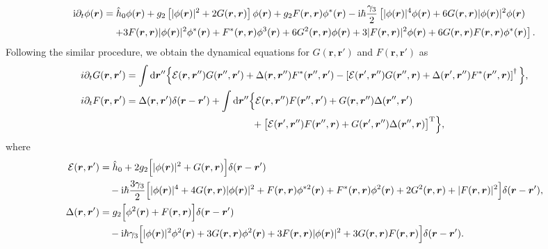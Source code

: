 \documentclass[pra,twocolumn,preprintnumbers,superscriptaddress,longbibliography,showkeys]{revtex4-1}
\begin{document}
\begin{widetext}
\begin{align}
{\rm i} \partial_{t} \phi({\bm r}) & = \hat h_{0} \phi({\bm r}) + g_{2} \left[ \vert \phi({\bm r}) \vert^{2} + 2G({\bm r}, {\bm r}) \right] \phi({\bm r}) + g_{2} F({\bm r}, {\bm r}) \phi^{\ast}({\bm r})-{\rm i} \hbar\frac{\gamma_{3}}{2} \left[ \vert \phi({\bm r}) \vert^{4} \phi({\bm r}) + 6 G({\bm r}, {\bm r}) \vert \phi({\bm r}) \vert^{2} \phi({\bm r})\right. \notag \\
&\quad\left.+ 3 F({\bm r}, {\bm r}) \vert \phi({\bm r}) \vert^{2} \phi^{\ast}({\bm r}) + F^{\ast}({\bm r}, {\bm r}) \phi^{3}({\bm r}) + 6 G^{2}({\bm r}, {\bm r}) \phi({\bm r})+ 3 \vert F({\bm r}, {\bm r}) \vert^{2} \phi({\bm r}) + 6 G({\bm r}, {\bm r}) F({\bm r}, {\bm r}) \phi^{\ast}({\bm r}) \right].\label{tevophi}
\end{align}
Following the similar procedure, we obtain the dynamical equations for $G({\bm r}, {\bm r}')$ and $F({\bm r}, {\bm r}')$ as
\begin{align}
i \partial_{t} G({\bm r}, {\bm r}') &= \int {\rm d}{\bm r}'' \Big\{ \mathcal{E}({\bm r}, {\bm r}'') G({\bm r}'', {\bm r}') + \Delta({\bm r}, {\bm r}'') F^{\ast}({\bm r}'', {\bm r}')- \left[ \mathcal{E}({\bm r}', {\bm r}'') G({\bm r}'', {\bm r}) + \Delta({\bm r}', {\bm r}'') F^{\ast}({\bm r}'', {\bm r}) \right]^{\dagger} \Big\},\label{tevog}\\
i \partial_{t} F({\bm r}, {\bm r}') &= \Delta({\bm r}, {\bm r}') \delta({\bm r} - {\bm r}') + \int {\rm d}{\bm r}'' \Big\{ \mathcal{E}({\bm r}, {\bm r}'') F({\bm r}'', {\bm r}')+ G({\bm r}, {\bm r}'') \Delta({\bm r}'', {\bm r}') \nonumber\\
&\qquad\qquad\qquad\qquad\qquad\qquad\quad+ \big[ \mathcal{E}({\bm r}', {\bm r}'') F({\bm r}'', {\bm r})+ G({\bm r}', {\bm r}'') \Delta({\bm r}'', {\bm r}) \big]^{\rm T} \Big\},\label{tevof}
\end{align}
where
\begin{align}
\mathcal{E}({\bm r}, {\bm r}^{\prime}) &= \hat h_{0} + 2 g_{2} \Big[ \vert \phi({\bm r}) \vert^{2} + G({\bm r}, {\bm r}) \Big]\delta({\bm r}-{\bm r}^{\prime}) \notag \\
&\quad - {\rm i} \hbar\frac{3 \gamma_{3}}{2} \Big[ \vert \phi({\bm r}) \vert^{4} + 4 G({\bm r}, {\bm r}) \vert \phi({\bm r}) \vert^{2} + F({\bm r}, {\bm r}) \phi^{\ast 2}({\bm r})+ F^{\ast}({\bm r}, {\bm r}) \phi^{2}({\bm r}) + 2 G^{2}({\bm r}, {\bm r}) + \vert F({\bm r}, {\bm r}) \vert^{2} \Big]\delta({\bm r}-{\bm r}^{\prime}),  \\
\Delta({\bm r}, {\bm r}^{\prime}) &= g_{2} \Big[ \phi^{2}({\bm r}) + F({\bm r}, {\bm r}) \Big]\delta({\bm r}-{\bm r}^{\prime})\nonumber\\
&\quad -{\rm i} \hbar\gamma_{3} \Big[ \vert \phi({\bm r}) \vert^{2} \phi^{2}({\bm r}) + 3 G({\bm r}, {\bm r}) \phi^{2}({\bm r})+ 3 F({\bm r}, {\bm r}) \vert \phi({\bm r}) \vert^{2} + 3 G({\bm r}, {\bm r}) F({\bm r}, {\bm r}) \Big]\delta({\bm r}-{\bm r}^{\prime}).
\end{align}
\end{widetext}
\end{document}
